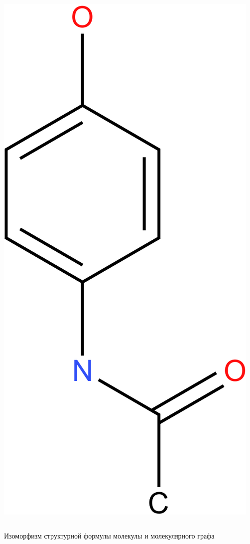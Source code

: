 \begin{frame}
\begin{columns}
\begin{column}{0.2\textwidth}
      \includegraphics[scale=0.3]{images/Diagram6.pdf}      
    \end{column}
   \end{columns}
   Изоморфизм структурной формулы молекулы и молекулярного графа
\end{frame}

